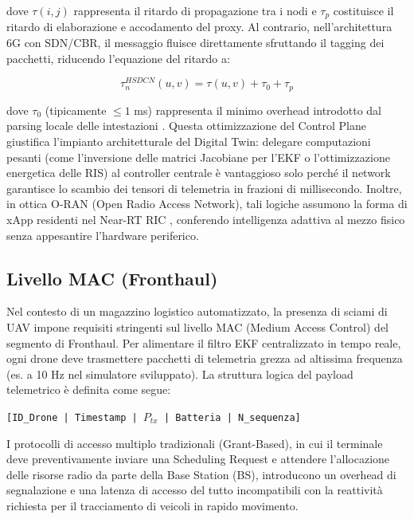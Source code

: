 \documentclass[twoside]{article}
\begin{document}
dove $\tau(i,j)$ rappresenta il ritardo di propagazione tra i nodi e $\tau_p$ costituisce il ritardo di elaborazione e accodamento del proxy. Al contrario, nell'architettura 6G con SDN/CBR, il messaggio fluisce direttamente sfruttando il tagging dei pacchetti, riducendo l'equazione del ritardo a:

\begin{equation}
\tau_n^{HSDCN}(u, v) = \tau(u, v) + \tau_0 + \tau_p
\label{eq:latency_6g_hsdcn}
\end{equation}

dove $\tau_0$ (tipicamente $\leq 1$ ms) rappresenta il minimo overhead introdotto dal parsing locale delle intestazioni \cite{Kolakowski2024}. Questa ottimizzazione del Control Plane giustifica l'impianto architetturale del Digital Twin: delegare computazioni pesanti (come l'inversione delle matrici Jacobiane per l'EKF o l'ottimizzazione energetica delle RIS) al controller centrale è vantaggioso solo perché il network garantisce lo scambio dei tensori di telemetria in frazioni di millisecondo. Inoltre, in ottica O-RAN (Open Radio Access Network), tali logiche assumono la forma di xApp residenti nel Near-RT RIC \cite{Lien2024}, conferendo intelligenza adattiva al mezzo fisico senza appesantire l'hardware periferico.
\subsection{Livello MAC (Fronthaul)}

Nel contesto di un magazzino logistico automatizzato, la presenza di sciami di UAV impone requisiti stringenti sul livello MAC (Medium Access Control) del segmento di Fronthaul. Per alimentare il filtro EKF centralizzato in tempo reale, ogni drone deve trasmettere pacchetti di telemetria grezza ad altissima frequenza (es. a 10 Hz nel simulatore sviluppato). La struttura logica del payload telemetrico è definita come segue:  
\begin{center}
\texttt{[ID\_Drone | Timestamp | $P_{tx}$ | Batteria | N\_sequenza]}
\end{center}

I protocolli di accesso multiplo tradizionali (Grant-Based), in cui il terminale deve preventivamente inviare una Scheduling Request e attendere l'allocazione delle risorse radio da parte della Base Station (BS), introducono un overhead di segnalazione e una latenza di accesso del tutto incompatibili con la reattività richiesta per il tracciamento di veicoli in rapido movimento.
\end{document}

